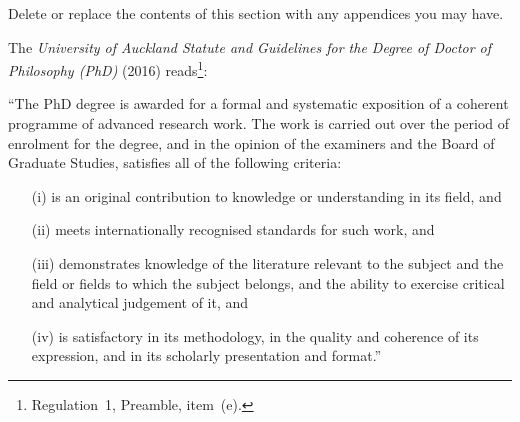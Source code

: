 \documentclass[12pt,a4paper]{article}
\begin{document}
Delete or replace the contents of this section with any
appendices you may have.

\bigskip

\bigskip

The \textit{University of Auckland Statute and Guidelines for the
Degree of Doctor of Philosophy (PhD)} (2016)
reads\footnote{Regulation~1, Preamble, item~(e).}:

\bigskip


\noindent
``The PhD degree is awarded for a formal and systematic
exposition of a coherent programme of advanced research
work. The work is  carried out over the period of enrolment
for the degree, and in the opinion of the examiners and the Board
of Graduate Studies, satisfies all of the following criteria:

\begin{itemize}

\item[(i)] is an original contribution to knowledge or
understanding in its field, and

\item[(ii)] meets internationally recognised standards
for such work, and

\item[(iii)] demonstrates knowledge of the literature
relevant to the subject and the field or fields to which
the subject belongs, and the ability to exercise critical
and analytical judgement of it, and

\item[(iv)] is satisfactory in its methodology, in the
quality and coherence of its expression, and in
its scholarly presentation and format.''

\end{itemize}






\end{document}

